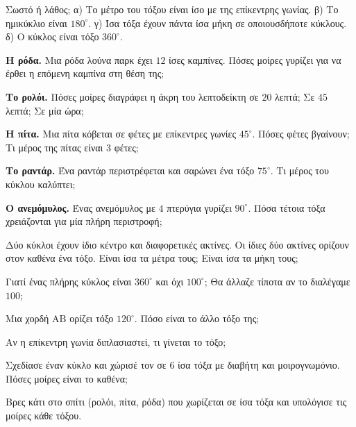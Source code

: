 \ex Σωστό ή λάθος; α) Το μέτρο του τόξου είναι ίσο με της επίκεντρης γωνίας. \quad β) Το ημικύκλιο είναι $180^\circ$. \quad γ) Ίσα τόξα έχουν πάντα ίσα μήκη σε οποιουσδήποτε κύκλους. \quad δ) Ο κύκλος είναι τόξο $360^\circ$.


\ex \textbf{Η ρόδα.} Μια ρόδα λούνα παρκ έχει $12$ ίσες καμπίνες. Πόσες μοίρες γυρίζει για να έρθει η επόμενη καμπίνα στη θέση της;

\ex \textbf{Το ρολόι.} Πόσες μοίρες διαγράφει η άκρη του λεπτοδείκτη σε $20$ λεπτά; Σε $45$ λεπτά; Σε μία ώρα;

\ex \textbf{Η πίτα.} Μια πίτα κόβεται σε φέτες με επίκεντρες γωνίες $45^\circ$. Πόσες φέτες βγαίνουν; Τι μέρος της πίτας είναι $3$ φέτες;

\ex \textbf{Το ραντάρ.} Ένα ραντάρ περιστρέφεται και σαρώνει ένα τόξο $75^\circ$. Τι μέρος του κύκλου καλύπτει;

\ex \textbf{Ο ανεμόμυλος.} Ένας ανεμόμυλος με $4$ πτερύγια γυρίζει $90^\circ$. Πόσα τέτοια τόξα χρειάζονται για μία πλήρη περιστροφή;


\ex Δύο κύκλοι έχουν ίδιο κέντρο και διαφορετικές ακτίνες. Οι ίδιες δύο ακτίνες ορίζουν στον καθένα ένα τόξο. Είναι ίσα τα μέτρα τους; Είναι ίσα τα μήκη τους;

\ex Γιατί ένας πλήρης κύκλος είναι $360^\circ$ και όχι $100^\circ$; Θα άλλαζε τίποτα αν το διαλέγαμε $100$;

\ex Μια χορδή $\mathrm{ΑΒ}$ ορίζει τόξο $120^\circ$. Πόσο είναι το άλλο τόξο της;

\ex Αν η επίκεντρη γωνία διπλασιαστεί, τι γίνεται το τόξο;


\ex Σχεδίασε έναν κύκλο και χώρισέ τον σε $6$ ίσα τόξα με διαβήτη και μοιρογνωμόνιο. Πόσες μοίρες είναι το καθένα;

\ex Βρες κάτι στο σπίτι (ρολόι, πίτα, ρόδα) που χωρίζεται σε ίσα τόξα και υπολόγισε τις μοίρες κάθε τόξου.
